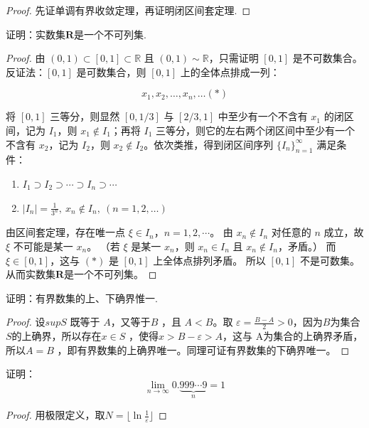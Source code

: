 \documentclass[lang=cn,12pt]{elegantbook}
\begin{document}
\begin{proof}
    先证单调有界收敛定理，再证明闭区间套定理.
\end{proof}

\begin{example}
    证明：实数集$\mathbf{R} $是一个不可列集.
\end{example}
\begin{proof}
    由 $(0,1) \subset [0,1] \subset \mathbb{R}$ 且 $(0,1) \sim \mathbb{R}$，只需证明 $[0,1]$ 是不可数集合。反证法：$[0,1]$ 是可数集合，则 $[0,1]$ 上的全体点排成一列：

\[x_1, x_2, \ldots, x_n, \ldots (\ast)\]

将 $[0,1]$ 三等分，则显然 $[0,1/3]$ 与 $[2/3,1]$ 中至少有一个不含有 $x_1$ 的闭区间，记为 $I_1$，则 $x_1 \notin I_1$；再将 $I_1$ 三等分，则它的左右两个闭区间中至少有一个不含有 $x_2$，记为 $I_2$，则 $x_2 \notin I_2$。依次类推，得到闭区间序列 $\{I_n\}_{n=1}^\infty$ 满足条件：

\begin{enumerate}
    \item[(1)] $I_1 \supset I_2 \supset \cdots \supset I_n \supset \cdots$
    \item[(2)] $|I_n| = \frac{1}{3^n},\ x_n \notin I_n,\ (n = 1, 2, \ldots)$
\end{enumerate}

由区间套定理，存在唯一点 $\xi \in I_n$，$n = 1, 2, \cdots$。
由 $x_n \notin I_n$ 对任意的 $n$ 成立，故 $\xi$ 不可能是某一 $x_n$。
（若 $\xi$ 是某一 $x_n$，则 $x_n \in I_n$ 且 $x_n \notin I_n$，矛盾。）
而 $\xi \in [0, 1]$，这与 $(\ast)$ 是 $[0, 1]$ 上全体点排列矛盾。
所以 $[0, 1]$ 不是可数集。从而实数集$\mathbf{R} $是一个不可列集。
\end{proof}

\begin{example}
    证明：有界数集的上、下确界惟一.
\end{example}
\begin{proof}
    设$sup S$ 既等于 $A$，又等于$B$ ，且 $A < B$。取 $\varepsilon = \frac{B-A}{2}>0$，因为$B $为集合$S $的上确界，所以存在$ x \in S$ ，使得$ x > B - \varepsilon > A$，这与 A为集合的上确界矛盾，所以$ A = B$ ，即有界数集的上确界唯一。同理可证有界数集的下确界唯一。
\end{proof}

\begin{example}
    证明：$$\lim_{n \to \infty}   0.\underbrace{999\cdots9}_n = 1$$
\end{example}
\begin{proof}
    用极限定义，取$N = \lfloor\ln{\frac{1}{\varepsilon}} \rfloor $
\end{proof}
\end{document}
